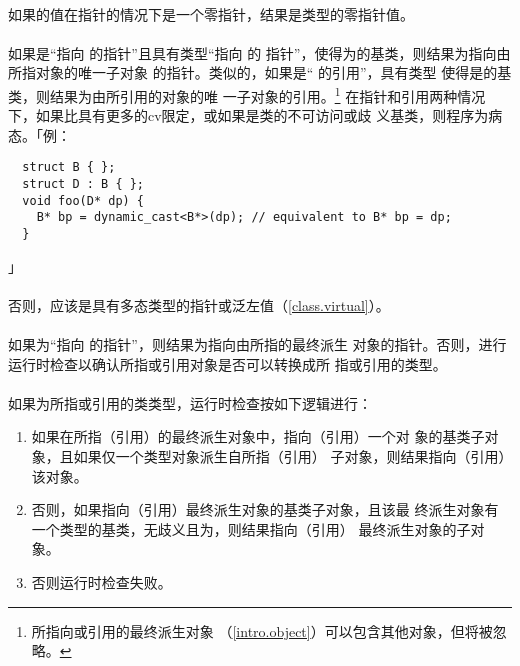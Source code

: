 \paragraph{}
如果的值在指针的情况下是一个零指针，结果是类型的零指针值。

\paragraph{}
如果是``指向 的指针''且具有类型``指向 的
指针''，使得为的基类，则结果为指向由所指对象的唯一子对象
的指针。类似的，如果是`` 的引用''，具有类型
 使得是的基类，则结果为由所引用的对象的唯
一子对象的引用。\footnote{所指向或引用的最终派生对象
（\ref{intro.object}）可以包含其他对象，但将被忽略。} 在指针和引用两种情况
下，如果比具有更多的cv限定，或如果是类的不可访问或歧
义基类，则程序为病态。「例：
\begin{lstlisting}
  struct B { };
  struct D : B { };
  void foo(D* dp) {
    B* bp = dynamic_cast<B*>(dp); // equivalent to B* bp = dp;
  }
\end{lstlisting}」

\paragraph{}
否则，应该是具有多态类型的指针或泛左值（\ref{class.virtual}）。

\paragraph{}
如果为``指向 的指针''，则结果为指向由所指的最终派生
对象的指针。否则，进行运行时检查以确认所指或引用对象是否可以转换成所
指或引用的类型。

\paragraph{}
如果为所指或引用的类类型，运行时检查按如下逻辑进行：
\begin{enumerate}
  \item{如果在所指（引用）的最终派生对象中，指向（引用）一个对
    象的基类子对象，且如果仅一个类型对象派生自所指（引用）
    子对象，则结果指向（引用）该对象。}
  \item{否则，如果指向（引用）最终派生对象的基类子对象，且该最
    终派生对象有一个类型的基类，无歧义且为，则结果指向（引用）
    最终派生对象的子对象。}
  \item{否则运行时检查失败。}
\end{enumerate}

